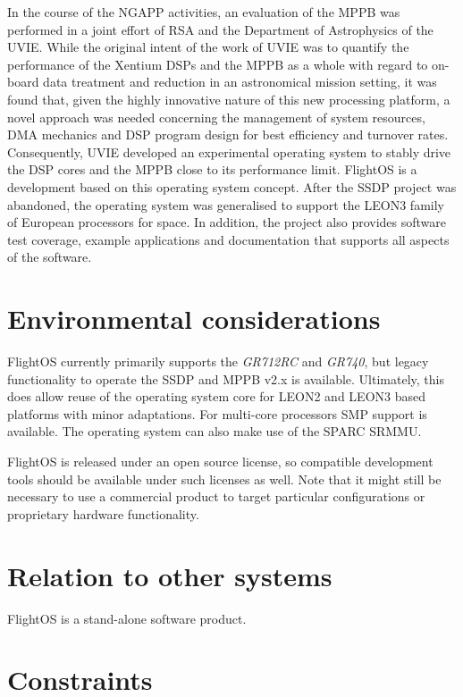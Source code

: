 In the course of the \gls{NGAPP} activities, an evaluation of the \gls{MPPB}
was performed in a joint effort of \gls{RSA} and the Department of Astrophysics
of the \gls{UVIE}. While the original intent of the work of \gls{UVIE} was to
quantify the performance of the \gls{Xentium} \glspl{DSP} and the \gls{MPPB} as a
whole with regard to on-board data treatment and reduction in an astronomical
mission setting, it was found that, given the highly innovative nature of this new
processing platform, a novel approach was needed concerning the management of
system resources, \gls{DMA} mechanics and \gls{DSP} program design for best
efficiency and turnover rates. Consequently, \gls{UVIE} developed an experimental
operating system to stably drive the \gls{DSP} cores and the \gls{MPPB} close
to its performance limit. FlightOS is a development based on this operating system
concept. After the \gls{SSDP} project was abandoned, the
operating system was generalised to support the \gls{LEON3} family of European
processors for space. In addition, the project also provides software test
coverage, example applications and documentation that supports all aspects
of the software.


\section{Environmental considerations}

FlightOS currently primarily supports the \emph{GR712RC} and \emph{GR740}, but
legacy functionality to operate the \gls{SSDP} and \gls{MPPB} v2.x is available.
Ultimately, this does allow reuse of the operating system core
for \gls{LEON2} and \gls{LEON3} based platforms with minor adaptations.
For multi-core processors \gls{SMP} support is available. The operating system
can also make use of the SPARC SRMMU.

FlightOS is released under an open source license, so compatible development
tools should be available under such licenses as well. Note that it might still
be necessary to use a commercial product to target particular configurations or
proprietary hardware functionality.


\section{Relation to other systems}

FlightOS is a stand-alone software product.


\section{Constraints}

